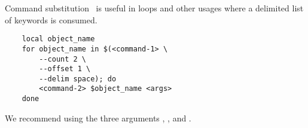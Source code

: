 Command substitution~\cite{command_substitution} is useful in  loops and other usages where a delimited list of keywords is consumed.
%
\begin{verbatim}
    local object_name
    for object_name in $(<command-1> \
        --count 2 \
        --offset 1 \
        --delim space); do
        <command-2> $object_name <args>
    done
\end{verbatim}
%
We recommend using the three arguments , , and .
